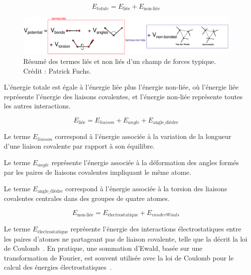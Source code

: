 	\begin{equation}
		\label{eq:forcefield}
		E_{totale} = E_\text{liée} + E_\text{non-liée}
	\end{equation}
	
	\begin{figure}[!htbp]
		\centering
		\includegraphics[width=\textwidth]{figures/ch1/ffterms}
		\caption[Termes d'un champ de forces]{Résumé des termes liés et non liés d'un champ de forces typique. Crédit : Patrick Fuchs\footnotemark.}
		\label{fig:ffterms}
	\end{figure}
	
	
	L'énergie totale est égale à l'énergie liée plus l'énergie non-liée, où l'énergie liée représente l'énergie des liaisons covalentes, et l'énergie non-liée représente toutes les autres interactions.
	
	\begin{equation}
		\label{eq:ebonded}
		E_\text{liée} = E_{liaison} + E_{angle} + E_\text{angle\_{}dièdre}
	\end{equation}
	
	Le terme $E_{liaison}$ correspond à l'énergie associée à la variation de la longueur d'une liaison covalente par rapport à son équilibre.%
	
	Le terme $E_{angle}$ représente l'énergie associée à la déformation des angles formés par les paires de liaisons covalentes impliquant le même atome.%
	
	Le terme $E_\text{angle\_{}dièdre}$ correspond à l'énergie associée à la \og torsion \fg{} des liaisons covalentes centrales dans des groupes de quatre atomes.
	
	\begin{equation}
		\label{eq:nonbonded}
		E_\text{non-liée} = E_\text{électrostatique} + E_{van der Waals}
	\end{equation}
	
	Le terme $E_\text{électrostatique}$ représente l'énergie des interactions électrostatiques entre les paires d'atomes ne partageant pas de liaison covalente, telle que la décrit la loi de Coulomb~\cite{coulomb1785premier}.
	En pratique, une sommation d'Ewald, basée sur une transformation de Fourier, est souvent utilisée avec la loi de Coulomb pour le calcul des énergies électrostatiques~\cite{ewald1921berechnung, essmann1995smooth}.
	
